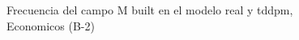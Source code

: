 \begin{figure}[H]
    \centering
    
    \caption{Frecuencia del campo M built en el modelo real y tddpm, Economicos (B-2)}
    \label{frecuency-M Built-tddpm_mlp}
\end{figure}